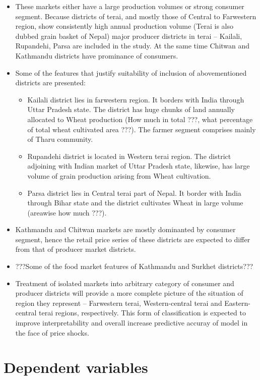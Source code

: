 \documentclass[
  12pt,
]{article}
\providecommand{\tightlist}{%
  \setlength{\itemsep}{0pt}\setlength{\parskip}{0pt}}
\begin{document}
\begin{itemize}
\tightlist
\item
  These markets either have a large production volumes or strong consumer segment. Because districts of terai, and mostly those of Central to Farwestern region, show consistently high annual production volume (Terai is also dubbed grain basket of Nepal) major producer districts in terai -- Kailali, Rupandehi, Parsa are included in the study. At the same time Chitwan and Kathmandu districts have prominance of consumers.
\item
  Some of the features that justify suitability of inclusion of abovementioned districts are presented:

  \begin{itemize}
  \tightlist
  \item
    Kailali district lies in farwestern region. It borders with India through Uttar Pradesh state. The district has huge chunks of land annually allocated to Wheat production (How much in total ???, what percentage of total wheat cultivated area ???). The farmer segment comprises mainly of Tharu community.
  \item
    Rupandehi district is located in Western terai region. The district adjoining with Indian market of Uttar Pradesh state, likewise, has large volume of grain production arising from Wheat cultivation.
  \item
    Parsa district lies in Central terai part of Nepal. It border with India through Bihar state and the district cultivates Wheat in large volume (areawise how much ???).
  \end{itemize}
\item
  Kathmandu and Chitwan markets are mostly dominanted by consumer segment, hence the retail price series of these districts are expected to differ from that of producer market districts.
\item
  ???Some of the food market features of Kathmandu and Surkhet districts???
\item
  Treatment of isolated markets into arbitrary category of consumer and producer districts will provide a more complete picture of the situation of region they represent -- Farwestern terai, Western-central terai and Eastern-central terai regions, respectively. This form of classification is expected to improve interpretability and overall increase predictive accuray of model in the face of price shocks.
\end{itemize}

\hypertarget{dependent-variables}{%
\section{Dependent variables}\label{dependent-variables}}
\end{document}
